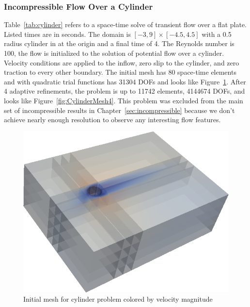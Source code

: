 \documentclass[Dissertation.tex]{subfiles}
\begin{document}
\subsubsection{Incompressible Flow Over a Cylinder}
\label{sec:incompressibleCylinder}
Table~\ref{tab:cylinder} refers to a space-time solve of transient flow over a flat plate. 
Listed times are in seconds.
The domain is $[-3,9]\times[-4.5,4.5]$ with a 0.5 radius cylinder in at the origin and a final time of 4.
The Reynolds number is 100, the flow is initialized to the solution of potential flow over a cylinder.
Velocity conditions are applied to the inflow, zero slip to the cylinder, and zero traction to every other boundary.
The initial mesh has 80 space-time elements and with quadratic trial functions has 31304 DOFs 
and looks like Figure~\ref{fig:CylinderMesh0}.
After 4 adaptive refinements, the problem is up to 11742 elements, 4144674 DOFs, 
and looks like Figure~\ref{fig:CylinderMesh4}.
This problem was excluded from the main set of incompressible results in Chapter~\ref{sec:incompressible}
because we don't achieve nearly enough resolution to observe any interesting flow features.

\begin{figure}[!ht]
\centering
\includegraphics[width=\textwidth]{Dissertation/Cylinder/Mesh_uMag0.png}
\caption{Initial mesh for cylinder problem colored by velocity magnitude}
\label{fig:CylinderMesh0}
\end{figure}
\end{document}
